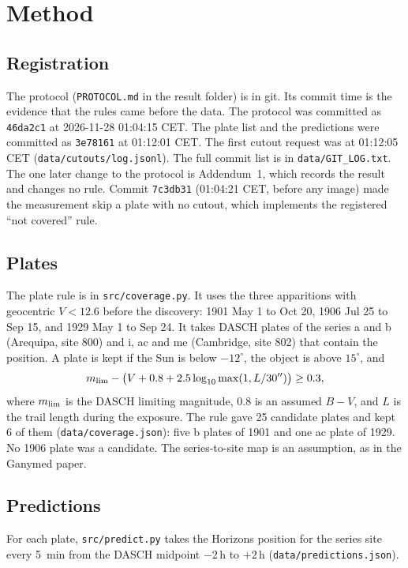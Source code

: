 \documentclass[11pt]{article}
\begin{document}
\section{Method}
\subsection{Registration}
The protocol (\texttt{PROTOCOL.md} in the result folder) is in git. Its commit time is the evidence that the rules came before the data. The protocol was committed as \texttt{46da2c1} at 2026-11-28 01:04:15 CET. The plate list and the predictions were committed as \texttt{3e78161} at 01:12:01 CET. The first cutout request was at 01:12:05 CET (\texttt{data/cutouts/log.jsonl}). The full commit list is in \texttt{data/GIT\_LOG.txt}. The one later change to the protocol is Addendum~1, which records the result and changes no rule. Commit \texttt{7c3db31} (01:04:21 CET, before any image) made the measurement skip a plate with no cutout, which implements the registered ``not covered'' rule.

\subsection{Plates}
The plate rule is in \texttt{src/coverage.py}. It uses the three apparitions with geocentric $V<12.6$ before the discovery: 1901 May 1 to Oct 20, 1906 Jul 25 to Sep 15, and 1929 May 1 to Sep 24. It takes DASCH plates of the series a and b (Arequipa, site 800) and i, ac and me (Cambridge, site 802) that contain the position. A plate is kept if the Sun is below $-12^\circ$, the object is above $15^\circ$, and
\[ m_{\rm lim} - \bigl(V + 0.8 + 2.5\log_{10}\max(1, L/30'')\bigr) \ge 0.3, \]
where $m_{\rm lim}$ is the DASCH limiting magnitude, 0.8 is an assumed $B-V$, and $L$ is the trail length during the exposure. The rule gave 25 candidate plates and kept 6 of them (\texttt{data/coverage.json}): five b plates of 1901 and one ac plate of 1929. No 1906 plate was a candidate. The series-to-site map is an assumption, as in the Ganymed paper.

\subsection{Predictions}
For each plate, \texttt{src/predict.py} takes the Horizons position for the series site every 5~min from the DASCH midpoint $-2$\,h to $+2$\,h (\texttt{data/predictions.json}).
\end{document}
